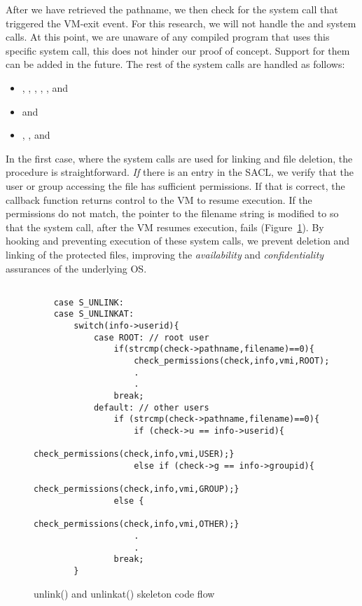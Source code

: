 \par After we have retrieved the pathname, we then check for the system call that triggered the VM-exit event. For this research, we will not handle the  and  system calls. At this point, we are unaware of any compiled program that uses this specific system call, this does not hinder our proof of concept. Support for them can be added in the future. The rest of the system calls are handled as follows: 


\begin{itemize}
	\item {}, , , , , and 
	\item {} and 
	\item {}, , and 
\end{itemize}

\par In the first case, where the system calls are used for linking and file deletion, the procedure is straightforward. \emph{If} there is an entry in the \ac{SACL}, we verify that the user or group accessing the file has sufficient permissions. If that is correct, the callback function returns control to the \ac{VM} to resume execution. If the permissions do not match, the pointer to the filename string is modified to  so that the system call, after the \ac{VM} resumes execution, fails (Figure~\ref{fig:unlink}). By hooking and preventing execution of these system calls, we prevent deletion and linking of the protected files, improving the \emph{availability} and \emph{confidentiality} assurances of the underlying \ac{OS}.

\begin{figure}[ht]
\selectfont
\begin{lstlisting}[style=CStyle]

	case S_UNLINK:
	case S_UNLINKAT:
		switch(info->userid){
			case ROOT: // root user
				if(strcmp(check->pathname,filename)==0){
					check_permissions(check,info,vmi,ROOT);			
					.
					.
				break;
			default: // other users
				if (strcmp(check->pathname,filename)==0){
					if (check->u == info->userid){
						check_permissions(check,info,vmi,USER);}
					else if (check->g == info->groupid){
						check_permissions(check,info,vmi,GROUP);}
				else {
					check_permissions(check,info,vmi,OTHER);}
					.
					.
				break;
		}
\end{lstlisting}
	\caption{unlink() and unlinkat() skeleton code flow}
	\label{fig:unlink}
\end{figure}

